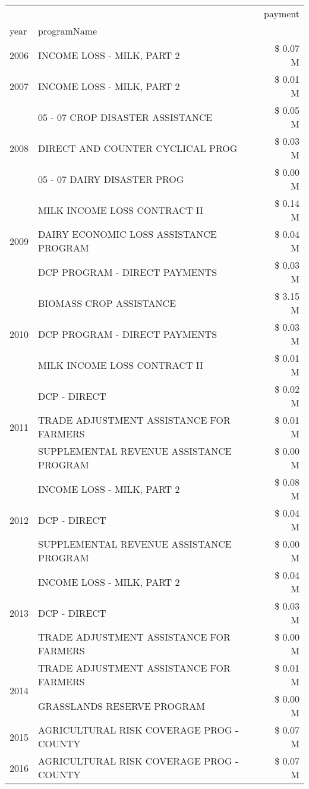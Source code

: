 \begin{tabular}{llr}
\toprule
 &  & payment \\
year & programName &  \\
\midrule
2006 & INCOME LOSS - MILK, PART 2 & \$ 0.07 M \\
\cline{1-3}
2007 & INCOME LOSS - MILK, PART 2 & \$ 0.01 M \\
\cline{1-3}
\multirow[t]{3}{*}{2008} & 05 - 07 CROP DISASTER ASSISTANCE & \$ 0.05 M \\
 & DIRECT AND COUNTER CYCLICAL PROG & \$ 0.03 M \\
 & 05 - 07 DAIRY DISASTER PROG & \$ 0.00 M \\
\cline{1-3}
\multirow[t]{3}{*}{2009} & MILK INCOME LOSS CONTRACT II & \$ 0.14 M \\
 & DAIRY ECONOMIC LOSS ASSISTANCE PROGRAM & \$ 0.04 M \\
 & DCP PROGRAM - DIRECT PAYMENTS & \$ 0.03 M \\
\cline{1-3}
\multirow[t]{3}{*}{2010} & BIOMASS CROP ASSISTANCE & \$ 3.15 M \\
 & DCP PROGRAM - DIRECT PAYMENTS & \$ 0.03 M \\
 & MILK INCOME LOSS CONTRACT II & \$ 0.01 M \\
\cline{1-3}
\multirow[t]{3}{*}{2011} & DCP - DIRECT & \$ 0.02 M \\
 & TRADE ADJUSTMENT ASSISTANCE FOR FARMERS & \$ 0.01 M \\
 & SUPPLEMENTAL REVENUE ASSISTANCE PROGRAM & \$ 0.00 M \\
\cline{1-3}
\multirow[t]{3}{*}{2012} & INCOME LOSS - MILK, PART 2 & \$ 0.08 M \\
 & DCP - DIRECT & \$ 0.04 M \\
 & SUPPLEMENTAL REVENUE ASSISTANCE PROGRAM & \$ 0.00 M \\
\cline{1-3}
\multirow[t]{3}{*}{2013} & INCOME LOSS - MILK, PART 2 & \$ 0.04 M \\
 & DCP - DIRECT & \$ 0.03 M \\
 & TRADE ADJUSTMENT ASSISTANCE FOR FARMERS & \$ 0.00 M \\
\cline{1-3}
\multirow[t]{2}{*}{2014} & TRADE ADJUSTMENT ASSISTANCE FOR FARMERS & \$ 0.01 M \\
 & GRASSLANDS RESERVE PROGRAM & \$ 0.00 M \\
\cline{1-3}
2015 & AGRICULTURAL RISK COVERAGE PROG - COUNTY & \$ 0.07 M \\
\cline{1-3}
\multirow[t]{3}{*}{2016} & AGRICULTURAL RISK COVERAGE PROG - COUNTY & \$ 0.07 M \\

\end{tabular}
